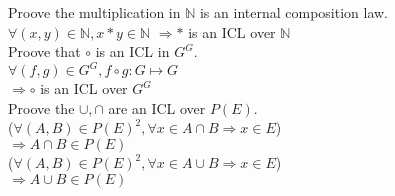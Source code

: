 \documentclass{article}
\begin{document}
\noindent Proove the multiplication in $\mathbb{N}$ is
an internal composition law.\\
$\forall (x, y) \in \mathbb{N}, x * y \in \mathbb{N}$
$\Rightarrow * $ is an ICL over $\mathbb{N}$\\

\noindent Proove that $\circ$ is an ICL in $G^G$.\\
$\forall (f, g) \in G^G, f \circ g : G \mapsto G$\\
$\Rightarrow \circ $ is an ICL over $G^G$\\

\noindent Proove the $\cup, \cap$ are an ICL over $P(E)$.\\
($\forall (A, B) \in P(E)^2, \forall x \in A \cap B
\Rightarrow x \in E$)\\
$\Rightarrow A \cap B \in P(E)$\\

\noindent ($\forall (A, B) \in P(E)^2, \forall x \in A \cup B
\Rightarrow x \in E$)\\
$\Rightarrow A \cup B \in P(E)$
\end{document}
